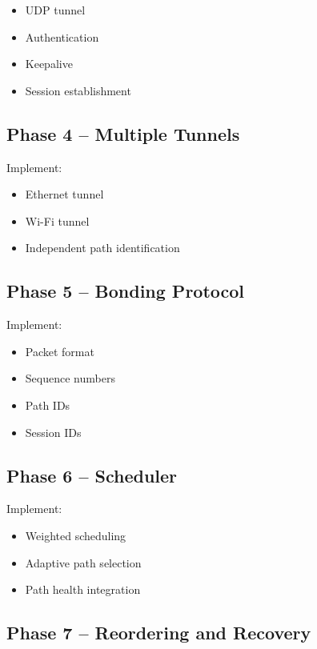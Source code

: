 \documentclass[12pt,a4paper]{article}
\begin{document}
\begin{itemize}
    \item UDP tunnel
    \item Authentication
    \item Keepalive
    \item Session establishment
\end{itemize}

\subsection{Phase 4 -- Multiple Tunnels}

Implement:

\begin{itemize}
    \item Ethernet tunnel
    \item Wi-Fi tunnel
    \item Independent path identification
\end{itemize}

\subsection{Phase 5 -- Bonding Protocol}

Implement:

\begin{itemize}
    \item Packet format
    \item Sequence numbers
    \item Path IDs
    \item Session IDs
\end{itemize}

\subsection{Phase 6 -- Scheduler}

Implement:

\begin{itemize}
    \item Weighted scheduling
    \item Adaptive path selection
    \item Path health integration
\end{itemize}

\subsection{Phase 7 -- Reordering and Recovery}
\end{document}
